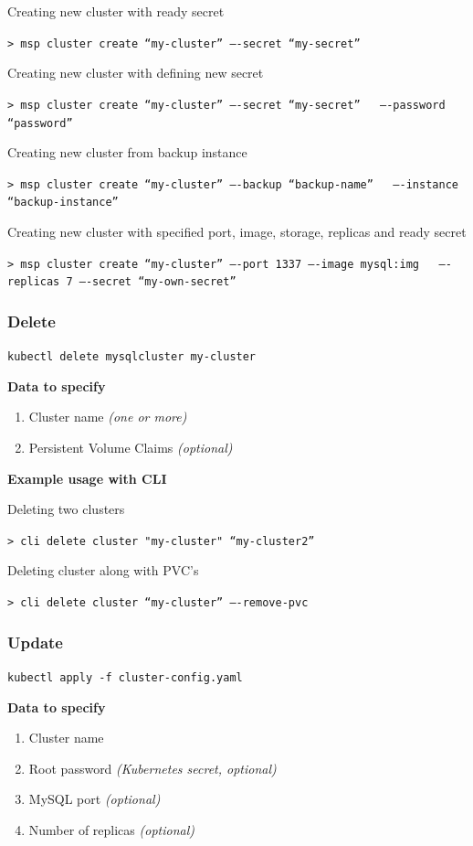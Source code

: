 \noindent Creating new cluster with ready secret

\texttt{> msp cluster create “my-cluster” ----secret “my-secret”}

\noindent Creating new cluster with defining new secret

\texttt{> msp cluster create “my-cluster” ----secret “my-secret” \ \newline
----password “password”}

\noindent Creating new cluster from backup instance

\texttt{> msp cluster create “my-cluster” ----backup “backup-name” \ \newline
	----instance “backup-instance”}

\noindent Creating new cluster with specified port, image, storage, replicas and ready secret

\texttt{> msp cluster create “my-cluster” ----port 1337 ----image mysql:img \ \newline
	----replicas 7 ----secret “my-own-secret”}

\subsubsection*{Delete}
\texttt{kubectl delete mysqlcluster my-cluster}


\noindent \textbf{Data to specify}
\begin{enumerate}
	\item Cluster name \textit{(one or more)}
	\item Persistent Volume Claims \textit{(optional)}
\end{enumerate}

\noindent \textbf{Example usage with CLI}

\noindent Deleting two clusters

\texttt{> cli delete cluster "my-cluster" “my-cluster2”}

\noindent Deleting cluster along with PVC’s

\texttt{> cli delete cluster “my-cluster” ----remove-pvc}

\subsubsection*{Update}
\texttt{kubectl apply -f cluster-config.yaml}

\noindent \textbf{Data to specify}
\begin{enumerate}
	\item Cluster name
	\item Root password \textit{(Kubernetes secret, optional)}
	\item MySQL port \textit{(optional)}
	\item Number of replicas \textit{(optional)}
\end{enumerate}

